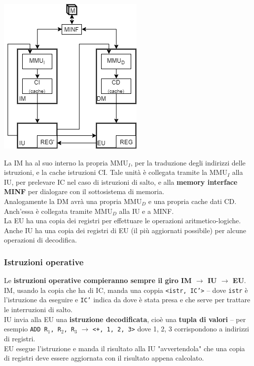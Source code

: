 \documentclass[10pt]{report}
\begin{document}
\pagebreak
\begin{multicols}{2}
\begin{center}
\includegraphics[scale=0.8]{procpipelineint.png}
\end{center}
La IM ha al suo interno la propria MMU$_I$, per la traduzione degli indirizzi delle istruzioni, e la cache istruzioni CI. Tale unità è collegata tramite la MMU$_I$ alla IU, per prelevare IC nel caso di istruzioni di salto, e alla \textbf{memory interface MINF} per dialogare con il sottosistema di memoria.\\
Analogamente la DM avrà una propria MMU$_D$ e una propria cache dati CD. Anch'essa è collegata tramite MMU$_D$ alla IU e a MINF.\\
La EU ha una copia dei registri per effettuare le operazioni aritmetico-logiche.\\
Anche IU ha una copia dei registri di EU (il più aggiornati possibile) per alcune operazioni di decodifica.
\end{multicols}
\subsubsection{Istruzioni operative}
Le \textbf{istruzioni operative compieranno sempre il giro IM $\rightarrow$ IU $\rightarrow$ EU}.\\
IM, usando la copia che ha di IC, manda una coppia \texttt{<istr, IC'>} -- dove \texttt{istr} è l'istruzione da eseguire e \texttt{IC'} indica da dove è stata presa e che serve per trattare le interruzioni di salto.\\
IU invia alla EU una \textbf{istruzione decodificata}, cioè una \textbf{tupla di valori} -- per esempio \texttt{ADD R$_1$, R$_2$, R$_3$} $\rightarrow$ \texttt{<+, 1, 2, 3>} dove 1, 2, 3 corrispondono a indirizzi di registri.\\
EU esegue l'istruzione e manda il risultato alla IU "avvertendola" che una copia di registri deve essere aggiornata con il risultato appena calcolato.
\end{document}
